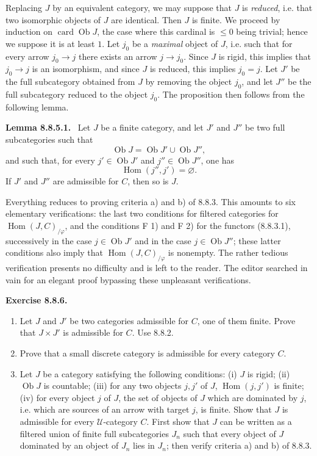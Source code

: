 \documentclass[11pt]{article}
\newcommand{\U}{\mathcal{U}}
\newcommand{\Ob}{\operatorname{Ob}}
\newcommand{\Hom}{\operatorname{Hom}}
\newcommand{\Hhom}{\operatorname{Hom}}
\newenvironment{statement}[1]{\par\medskip\noindent\textbf{#1.}\ }{\par\medskip}
\begin{document}
Replacing $J$ by an equivalent category, we may suppose that $J$ is \emph{reduced}, i.e. that two isomorphic objects of $J$ are identical. Then $J$ is finite. We proceed by induction on $\operatorname{card}\Ob J$, the case where this cardinal is $\leq0$ being trivial; hence we suppose it is at least $1$. Let $j_0$ be a \emph{maximal} object of $J$, i.e. such that for every arrow $j_0\to j$ there exists an arrow $j\to j_0$. Since $J$ is rigid, this implies that $j_0\to j$ is an isomorphism, and since $J$ is reduced, this implies $j_0=j$. Let $J'$ be the full subcategory obtained from $J$ by removing the object $j_0$, and let $J''$ be the full subcategory reduced to the object $j_0$. The proposition then follows from the following lemma.

\begin{statement}{Lemma 8.8.5.1}
Let $J$ be a finite category, and let $J'$ and $J''$ be two full subcategories such that
\[
 \Ob J=\Ob J'\cup\Ob J'',
\]
and such that, for every $j'\in\Ob J'$ and $j''\in\Ob J''$, one has
\[
 \Hom(j'',j')=\varnothing.
\]
If $J'$ and $J''$ are admissible for $C$, then so is $J$.
\end{statement}

Everything reduces to proving criteria a) and b) of 8.8.3. This amounts to six elementary verifications: the last two conditions for filtered categories for $\Hhom(J,C)_{/\varphi}$, and the conditions F 1) and F 2) for the functors (8.8.3.1), successively in the case $j\in\Ob J'$ and in the case $j\in\Ob J''$; these latter conditions also imply that $\Hhom(J,C)_{/\varphi}$ is nonempty. The rather tedious verification presents no difficulty and is left to the reader. The editor searched in vain for an elegant proof bypassing these unpleasant verifications.

\begin{statement}{Exercise 8.8.6}
\begin{enumerate}[label=\alph*)]
\item Let $J$ and $J'$ be two categories admissible for $C$, one of them finite. Prove that $J\times J'$ is admissible for $C$. Use 8.8.2.
\item Prove that a small discrete category is admissible for every category $C$.
\item Let $J$ be a category satisfying the following conditions: \textup{(i)} $J$ is rigid; \textup{(ii)} $\Ob J$ is countable; \textup{(iii)} for any two objects $j,j'$ of $J$, $\Hom(j,j')$ is finite; \textup{(iv)} for every object $j$ of $J$, the set of objects of $J$ which are dominated by $j$, i.e. which are sources of an arrow with target $j$, is finite. Show that $J$ is admissible for every $\U$-category $C$. First show that $J$ can be written as a filtered union of finite full subcategories $J_n$ such that every object of $J$ dominated by an object of $J_n$ lies in $J_n$; then verify criteria a) and b) of 8.8.3.
\end{enumerate}
\end{statement}
\end{document}
